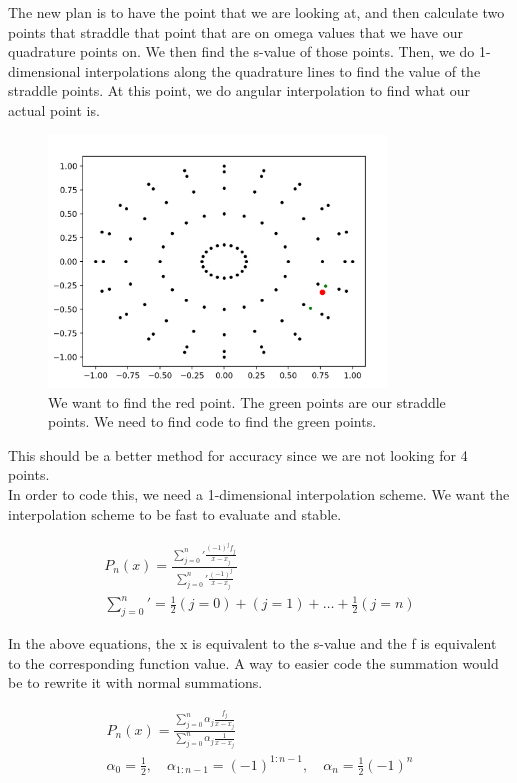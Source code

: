 
The new plan is to have the point that we are looking at, and then calculate two points that straddle that point that are on omega values that we have our quadrature points on. We then find the s-value of those points. Then, we do 1-dimensional interpolations along the quadrature lines to find the value of the straddle points. At this point, we do angular interpolation to find what our actual point is. 

\begin{figure}[H]
\centering
\includegraphics[width=0.8\textwidth]{StraddlePoints.jpg}
\caption{We want to find the red point. The green points are our straddle points. We need to find code to find the green points.}
\end{figure}

This should be a better method for accuracy since we are not looking for 4 points. \\

In order to code this, we need a 1-dimensional interpolation scheme. We want the interpolation scheme to be fast to evaluate and stable. 

\begin{align*}
P_n(x) = \frac{{\sum_{j = 0}^{n}}' \frac{(-1)^j f_j}{x-x_j}}{{\sum_{j = 0}^{n}}' \frac{(-1)^j}{x-x_j}} \\
{\sum _{j = 0}^{n}}' = \frac{1}{2}(j = 0) + (j = 1) + \dots + \frac{1}{2}(j = n)
\end{align*}

In the above equations, the x is equivalent to the s-value and the f is equivalent to the corresponding function value. A way to easier code the summation would be to rewrite it with normal summations.

\begin{align*}
P_n(x) = \frac{\sum_{j = 0}^{n} \alpha_j \frac{f_j}{x-x_j}}{\sum_{j = 0}^{n} \alpha_j\frac{1}{x-x_j}} \\
\alpha_0 = \frac{1}{2},\quad \alpha_{1:n-1} = (-1)^{1:n-1},\quad \alpha_n = \frac{1}{2} (-1)^n
\end{align*}